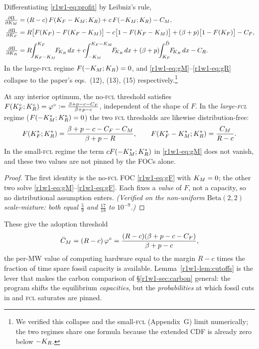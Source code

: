 \begin{lemma}\label{r1w1-lem:foc}
Differentiating \eqref{r1w1-eq:profit} by Leibniz's rule,
\begin{align}
  \tfrac{\partial\Pi}{\partial\KM}
    &=(R-c)\,F(\KF-\KM;\KR)+c\,F(-\KM;\KR)-\CM,\label{r1w1-eq:gM}\\[2pt]
  \tfrac{\partial\Pi}{\partial\KF}
    &=R\big[F(\KF)-F(\KF-\KM)\big]-c\big[1-F(\KF-\KM)\big]
      +(\bp)\big[1-F(\KF)\big]-\CF,\label{r1w1-eq:gF}\\[2pt]
  \tfrac{\partial\Pi}{\partial\KR}
    &=R\!\!\int_{\KF-\KM}^{\KF}\!\!\FKR\,dx
      +c\!\!\int_{-\KM}^{\KF-\KM}\!\!\FKR\,dx
      +(\bp)\!\!\int_{\KF}^{\Dbar}\!\!\FKR\,dx-\CR.\label{r1w1-eq:gR}
\end{align}
In the large-\textsc{fcl} regime $F(-K_M;K_R)=0$, and \eqref{r1w1-eq:gM}--\eqref{r1w1-eq:gR}
collapse to the paper's eqs.\ (12), (13), (15) respectively.\footnote{We verified
this collapse and the small-\textsc{fcl} (Appendix~G) limit numerically; the two
regimes share one formula because the extended CDF is already zero below $-K_R$.}
\end{lemma}

\begin{lemma}\label{r1w1-lem:cutoffs}
At any interior optimum, the no-\textsc{fcl} threshold satisfies
$F(K_F^{\circ};K_R^{\circ})=\varphi^{\circ}\vcentcolon=\frac{\beta+p-c-C_F}{\beta+p-c}$, independent of the
shape of $F$. In the \emph{large-\textsc{fcl}} regime ($F(-K_M^{*};K_R^{*})=0$) the two
\textsc{fcl} thresholds are likewise distribution-free:
\begin{equation}\label{r1w1-eq:cutoffs}
  F(K_F^{*};K_R^{*})=\frac{\beta+p-c-C_F-C_M}{\beta+p-R},
  \qquad
  F(K_F^{*}-K_M^{*};K_R^{*})=\frac{C_M}{R-c}.
\end{equation}
In the small-\textsc{fcl} regime the term $cF(-K_M^{*};K_R^{*})$ in \eqref{r1w1-eq:gM} does
not vanish, and these two values are not pinned by the FOCs alone.
\end{lemma}
\begin{proof}
The first identity is the no-\textsc{fcl} FOC \eqref{r1w1-eq:gF} with $K_M=0$; the
other two solve \eqref{r1w1-eq:gM}--\eqref{r1w1-eq:gF}. Each fixes a \emph{value} of $F$,
not a capacity, so no distributional assumption enters. \emph{(Verified on the
non-uniform $\mathrm{Beta}(2,2)$ scale-mixture: both equal $\tfrac{5}{9}$ and
$\tfrac{17}{18}$ to $10^{-9}$.)}
\end{proof}

\noindent These give the adoption threshold
\begin{equation}\label{r1w1-eq:cbar}
  \bar C_M=(R-c)\,\varphi^{\circ}=\frac{(R-c)(\beta+p-c-C_F)}{\beta+p-c},
\end{equation}
the per-MW value of computing hardware equal to the margin $R-c$ times the
fraction of time spare fossil capacity is available. Lemma~\ref{r1w1-lem:cutoffs} is
the lever that makes the carbon comparison of \S\ref{r1w1-sec:carbon} general: the
program shifts the equilibrium \emph{capacities}, but the \emph{probabilities}
at which fossil cuts in and \textsc{fcl} saturates are pinned.

